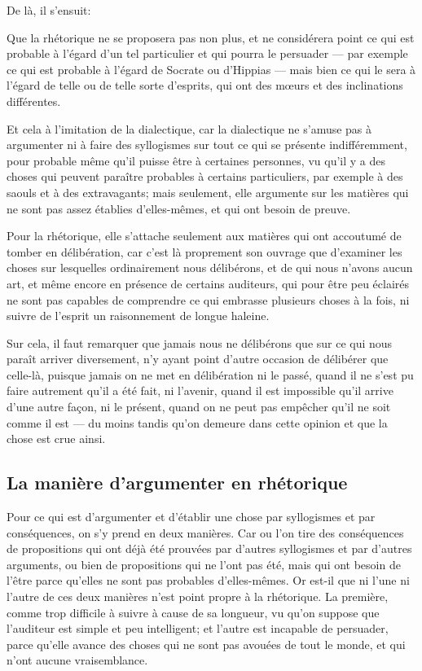 De là, il s'ensuit:

\begin{emphpar}
	Que la rhétorique ne se proposera pas non plus, et ne considérera point ce qui est probable à l'égard d'un tel particulier
	et qui pourra le persuader --- par exemple ce qui est probable à l'égard de Socrate ou d'Hippias --- mais bien ce qui le
	sera à l'égard de telle ou de telle sorte d'esprits, qui ont des mœurs et des inclinations différentes.
\end{emphpar}

Et cela à l'imitation de la dialectique, car la dialectique ne s'amuse pas à argumenter ni à faire des syllogismes sur tout ce qui se présente
indifféremment, pour probable même qu'il puisse être à certaines personnes, vu qu'il y a des choses qui peuvent paraître probables à certains
particuliers, par exemple à des saouls et à des extravagants; mais seulement, elle argumente sur les matières qui ne sont pas assez établies
d'elles-mêmes, et qui ont besoin de preuve. 

Pour la rhétorique, elle s'attache seulement aux matières qui ont accoutumé de tomber en délibération, car c'est là proprement son ouvrage que
d'examiner les choses sur lesquelles ordinairement nous délibérons, et de qui nous n'avons aucun art, et même encore en présence de certains
auditeurs, qui pour être peu éclairés ne sont pas capables de comprendre ce qui embrasse plusieurs choses à la fois, ni suivre de l'esprit un
raisonnement de longue haleine.

Sur cela, il faut remarquer que jamais nous ne délibérons que sur ce qui nous paraît arriver diversement, n'y ayant point d'autre occasion de
délibérer que celle-là, puisque jamais on ne met en délibération ni le passé, quand il ne s'est pu faire autrement qu'il a été fait, ni l'avenir,
quand il est impossible qu'il arrive d'une autre façon, ni le présent, quand on ne peut pas empêcher qu'il ne soit comme il est --- du moins
tandis qu'on demeure dans cette opinion et que la chose est crue ainsi.

\subsection{La manière d'argumenter en rhétorique}

Pour ce qui est d'argumenter et d'établir une chose par syllogismes et par conséquences, on s'y prend en deux manières. Car ou l'on tire des
conséquences de propositions qui ont déjà été prouvées par d'autres syllogismes et par d'autres arguments, ou bien de propositions qui ne l'ont
pas été, mais qui ont besoin de l'être parce qu'elles ne sont pas probables d'elles-mêmes. Or est-il que ni l'une ni l'autre de ces deux manières
n'est point propre à la rhétorique. La première, comme trop difficile à suivre à cause de sa longueur, vu qu'on suppose que l'auditeur est simple
et peu intelligent; et l'autre est incapable de persuader, parce qu'elle avance des choses qui ne sont pas avouées de tout le monde, et qui n'ont
aucune vraisemblance. 

